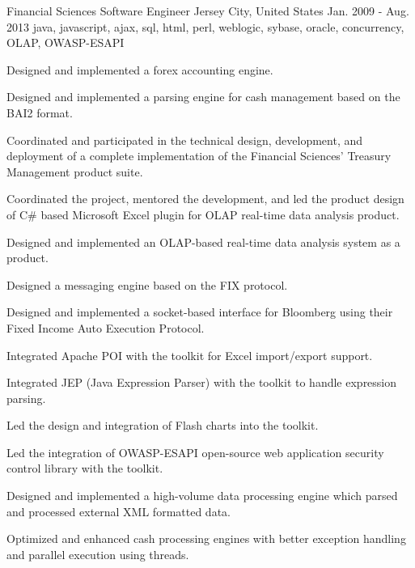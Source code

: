 \cventry
    {Financial Sciences} %
    {Software Engineer} %
    {Jersey City, United States} %
    {Jan. 2009 - Aug. 2013} %
    {java, javascript, ajax, sql, html, perl, weblogic, sybase, oracle, concurrency, OLAP, OWASP-ESAPI} %
    {
    \begin{cvitems} %
        \item {Designed and implemented a forex accounting engine. }
        \item {Designed and implemented a parsing engine for cash management based on the BAI2 format.}
        \item {Coordinated and participated in the technical design, development, and deployment of a complete implementation of the Financial Sciences' Treasury Management product suite.}
        \item {Coordinated the project, mentored the development, and led the product design of C\# based Microsoft Excel plugin for OLAP real-time data analysis product.}
        \item {Designed and implemented an OLAP-based real-time data analysis system as a product. }
        \item {Designed a messaging engine based on the FIX protocol. }
        \item {Designed and implemented a socket-based interface for Bloomberg using their Fixed Income Auto Execution Protocol. }
        \item {Integrated Apache POI with the toolkit for Excel import/export support.}
        \item {Integrated JEP (Java Expression Parser) with the toolkit to handle expression parsing.}
        \item {Led the design and integration of Flash charts into the toolkit. }
        \item {Led the integration of OWASP-ESAPI open-source web application security control library with the toolkit.}
        \item {Designed and implemented a high-volume data processing engine which parsed and processed external XML formatted data. }
        \item {Optimized and enhanced cash processing engines with better exception handling and parallel execution using threads.}
    \end{cvitems}
    }